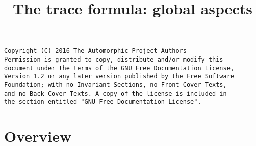 

%


\title{The trace formula: global aspects}


\maketitle

\label{section-phantom}

\begin{verbatim}
Copyright (C) 2016 The Automorphic Project Authors
Permission is granted to copy, distribute and/or modify this
document under the terms of the GNU Free Documentation License,
Version 1.2 or any later version published by the Free Software
Foundation; with no Invariant Sections, no Front-Cover Texts,
and no Back-Cover Texts. A copy of the license is included in
the section entitled "GNU Free Documentation License".
\end{verbatim}

\tableofcontents


\section{Overview}
\label{section-overview}








